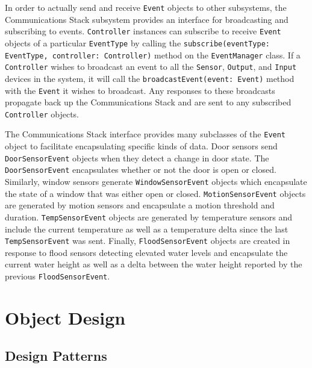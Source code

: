 \documentclass{report}
\begin{document}
In order to actually send and receive \texttt{Event} objects to other
subsystems, the Communications Stack subsystem provides an interface
for broadcasting and subscribing to events. \texttt{Controller}
instances can subscribe to receive \texttt{Event} objects of a
particular \texttt{EventType} by calling the
\texttt{subscribe(eventType: EventType, controller: Controller)}
method on the \texttt{EventManager} class. If a \texttt{Controller}
wishes to broadcast an event to all the \texttt{Sensor},
\texttt{Output}, and \texttt{Input} devices in the system, it will
call the \texttt{broadcastEvent(event: Event)} method with the
\texttt{Event} it wishes to broadcast. Any responses to these
broadcasts propagate back up the Communications Stack and are sent to
any subscribed \texttt{Controller} objects.

The Communications Stack interface provides many subclasses of the
\texttt{Event} object to facilitate encapsulating specific kinds of
data. Door sensors send \texttt{DoorSensorEvent} objects when they
detect a change in door state. The \texttt{DoorSensorEvent}
encapsulates whether or not the door is open or closed. Similarly,
window sensors generate \texttt{WindowSensorEvent} objects which
encapsulate the state of a window that was either open or
closed. \texttt{MotionSensorEvent} objects are generated by motion
sensors and encapsulate a motion threshold and
duration. \texttt{TempSensorEvent} objects are generated by
temperature sensors and include the current temperature as well as a
temperature delta since the last \texttt{TempSensorEvent} was sent. 
Finally, \texttt{FloodSensorEvent} objects are created in response to
flood sensors detecting elevated water levels and encapsulate the
current water height as well as a delta between the water height
reported by the previous \texttt{FloodSensorEvent}. 


\chapter{Object Design} %
\label{ch:object-design}


\section{Design Patterns}

\end{document}
